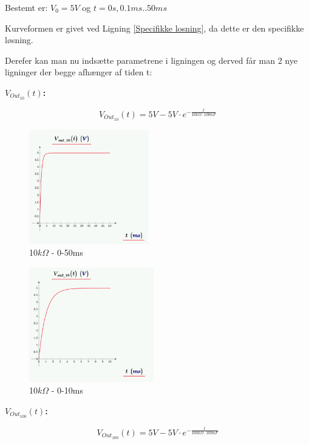 Bestemt er:
$V_{0}=5V$ og $t=0s,0.1ms..50ms$

Kurveformen er givet ved Ligning \ref{Specifikke losning}, da dette er den specifikke løsning.



Derefer kan man nu indsætte parametrene i ligningen og derved får man 2 nye ligninger der begge afhænger af tiden t:

\textbf{$V_{Out_{10}}(t)$:}
\begin{center}
\begin{equation}
V_{Out_{10}}(t) = 5V-5V \cdot e^{-\frac{t}{10k\Omega \cdot 100nF}} 
\label{V_Out_10}
\end{equation}
\end{center}


\begin{center}
\begin{figure}[h]
  \includegraphics[height=5cm]{M_Fig/V_out_10_1}
\caption{10$k\Omega$ - 0-50ms}
\label{10kOhm50ms}
\end{figure}
\end{center}
  
\begin{center}
\begin{figure}[h]
 \includegraphics[height=5cm]{M_Fig/V_out_10_2}
\caption{10$k\Omega$ - 0-10ms}
\label{10kOhm10ms}
\end{figure}
\end{center}


\textbf{$V_{Out_{100}}(t)$:}
\begin{center}
\begin{equation}
V_{Out_{100}}(t) = 5V-5V \cdot e^{-\frac{t}{100k\Omega \cdot 100nF}} 
\label{V_Out_100}
\end{equation}
\end{center}

